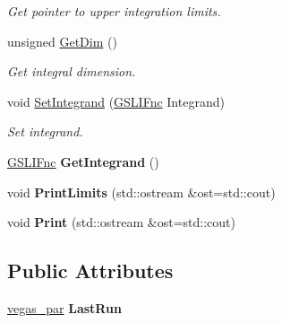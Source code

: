 \begin{DoxyCompactItemize}
\begin{DoxyCompactList}\small\item\em Get pointer to upper integration limits. \end{DoxyCompactList}\item 
\hypertarget{classIntegral_a6ed296293c2b08c0236481e865f853b7}{}unsigned \hyperlink{classIntegral_a6ed296293c2b08c0236481e865f853b7}{Get\+Dim} ()\label{classIntegral_a6ed296293c2b08c0236481e865f853b7}

\begin{DoxyCompactList}\small\item\em Get integral dimension. \end{DoxyCompactList}\item 
\hypertarget{classIntegral_ad1732ff730fedb0318db082f664aa195}{}void \hyperlink{classIntegral_ad1732ff730fedb0318db082f664aa195}{Set\+Integrand} (\hyperlink{Integrator_8h_a5a37a44de4bd56d47abffb5be0efb308}{G\+S\+L\+I\+Fnc} Integrand)\label{classIntegral_ad1732ff730fedb0318db082f664aa195}

\begin{DoxyCompactList}\small\item\em Set integrand. \end{DoxyCompactList}\item 
\hypertarget{classIntegral_a434ffd1525d0110a9e0d472721f51a32}{}\hyperlink{Integrator_8h_a5a37a44de4bd56d47abffb5be0efb308}{G\+S\+L\+I\+Fnc} {\bfseries Get\+Integrand} ()\label{classIntegral_a434ffd1525d0110a9e0d472721f51a32}

\item 
\hypertarget{classIntegral_a318a1ac7c8715d403046764afc47e66c}{}void {\bfseries Print\+Limits} (std\+::ostream \&ost=std\+::cout)\label{classIntegral_a318a1ac7c8715d403046764afc47e66c}

\item 
\hypertarget{classIntegral_ac16a7e08428f7b1879638a9a2981aea6}{}void {\bfseries Print} (std\+::ostream \&ost=std\+::cout)\label{classIntegral_ac16a7e08428f7b1879638a9a2981aea6}

\end{DoxyCompactItemize}
\subsection*{Public Attributes}
\begin{DoxyCompactItemize}
\item 
\hypertarget{classIntegral_a9d7c0d25642cec0937e5fae17b58b5bc}{}\hyperlink{classvegas__par}{vegas\+\_\+par} {\bfseries Last\+Run}\label{classIntegral_a9d7c0d25642cec0937e5fae17b58b5bc}

\end{DoxyCompactItemize}


